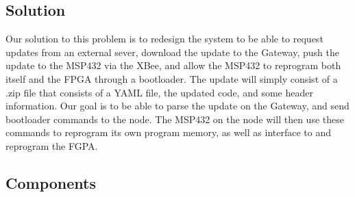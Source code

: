 \documentclass[11pt]{article}
\begin{document}
\subsection{Solution}
Our solution to this problem is to redesign the system to be able to request updates from an external sever, download the update to the Gateway, push the update to the MSP432 via the XBee, and allow the MSP432 to reprogram both itself and the FPGA through a bootloader. The update will simply consist of a .zip file that consists of a YAML file, the updated code, and some header information. Our goal is to be able to parse the update on the Gateway, and send bootloader commands to the node. The MSP432 on the node will then use these commands to reprogram its own program memory, as well as interface to and reprogram the FGPA. 


\subsection{Components}
\end{document}
